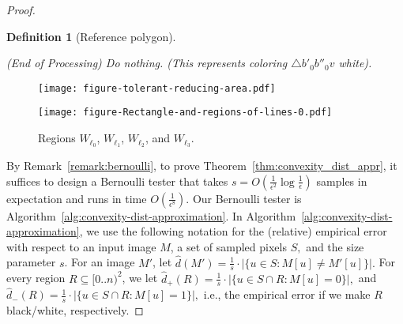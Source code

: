 \documentclass[11pt,english]{article}
\renewenvironment{enumerate}[1]{\begin{compactenum}#1}{\end{compactenum}}
\newtheorem{definition}{Definition}[section]
\numberwithin{figure}{section}
\newcommand{\integerset}[1]{[0..{#1})}
\newcommand{\domain}{\integerset{n}^2}
\newcommand{\mydelta}{\epsilon} \newcommand{\bigdelta}{{\epsilon_0}} \newcommand{\dsquares}{d_{\rm squares}}
\newcommand{\dout}{\hat{d}}
\begin{document}
\begin{proof}
\begin{definition}[Reference polygon]
\begin{enumerate}
\item\label{item:ref-poly-definition-short} {\sf (End of Processing)} Do nothing. (This represents coloring $\bigtriangleup b'_0b''_0v$ white).
\end{enumerate}
\end{definition}
\ifnum{}
\begin{figure}[ht]
\begin{minipage}[b]{0.55\linewidth}
\centering
\texttt{[image: figure-tolerant-reducing-area.pdf]}
\caption{ An illustration to Definition~\ref{def:reference-polygons}: Triangle $\bigtriangleup b'b''v$.}
\label{fig:tolerant-reducing-area}
\end{minipage}
\hspace{0.01\linewidth}
\begin{minipage}[b]{0.48\linewidth}
\centering
\texttt{[image: figure-Rectangle-and-regions-of-lines-0.pdf]}
\caption{ Regions $W_{\ell_0}$, $W_{\ell_1}$, $W_{\ell_2}$, and $W_{\ell_3}$.}
\label{fig:w-regions}
\end{minipage}
\end{figure}
\fi

By Remark~\ref{remark:bernoulli}, to prove Theorem~\ref{thm:convexity_dist_appr}, it suffices to design a Bernoulli tester that takes $s=O(\frac 1 {\mydelta^2}\log \frac 1\mydelta)$ samples in expectation and runs in time $O(\frac 1 {\mydelta^8})$. Our Bernoulli tester is Algorithm~\ref{alg:convexity-dist-approximation}.
In Algorithm~\ref{alg:convexity-dist-approximation}, we use the following notation for the (relative) empirical error with respect to an input image $M$, a set of sampled pixels $S,$ and the size parameter $s$. For an image $M'$, let
$\dout(M')=\frac 1 s \cdot |\{u\in S : M[u]\neq M'[u]\}|.$ For every region $R\subseteq\domain$, we let
$\dout_+(R)=\frac 1 s \cdot |\{u\in S\cap R : M[u]=0\}|,$ and
$\dout_-(R)=\frac 1 s \cdot |\{u\in S\cap R : M[u]=1\}|,$ i.e., the empirical error if we make $R$ black/white, respectively.


\end{proof}
\end{document}
